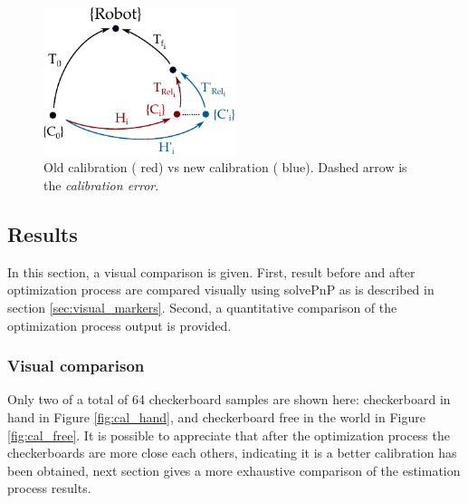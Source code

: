 \begin{figure}[!htbp]
 \centering
 \includegraphics[width=0.5\textwidth]{images/update02.pdf}
 \caption{Old calibration ({\color{red} red}) vs new calibration ({\color{blue} blue}). Dashed arrow is the \textit{calibration error}.}
 \label{fig:update02}
\end{figure}


\subsection{Results}
\label{sec:results}

In this section, a visual comparison is given. First, result before and after optimization process are compared visually using solvePnP as is described in section \ref{sec:visual_markers}. Second, a quantitative comparison of the optimization process output is provided.

\subsubsection{Visual comparison}

Only two of a total of 64 checkerboard samples are shown here: checkerboard in hand in Figure \ref{fig:cal_hand}, and checkerboard free in the world in Figure \ref{fig:cal_free}. It is possible to appreciate that after the optimization process the checkerboards are more close each others, indicating it is a better calibration has been obtained, next section gives a more exhaustive comparison of the estimation process results.
%

